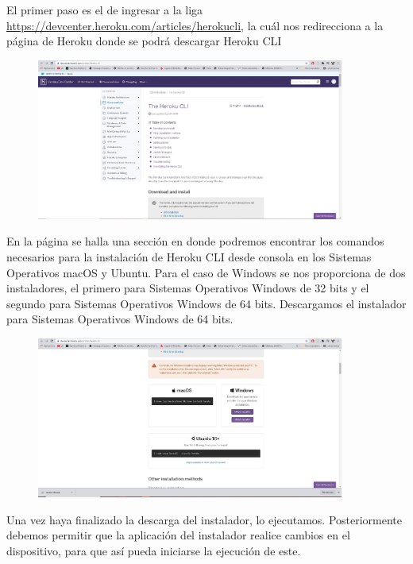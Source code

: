 \documentclass[10pt,a4paper]{article} %
\begin{document}
	\begin{enumerate}
		{\large
			\item El primer paso es el de ingresar a la liga \underline{https://devcenter.heroku.com/articles/herokucli}, la cu{\'a}l nos redirecciona a la p{\'a}gina de Heroku donde se podr{\'a} descargar Heroku CLI
			\begin{figure}[H]
				\includegraphics[width=0.9\textwidth]{1.jpg}
				\centering
				\label{img:paso1}
			\end{figure}
			\item En la p{\'a}gina se halla una secci{\'o}n en donde podremos encontrar los comandos necesarios para la instalaci{\'o}n de Heroku CLI desde consola en los Sistemas Operativos macOS y Ubuntu. Para el caso de Windows se nos proporciona de dos instaladores, el primero para Sistemas Operativos Windows de 32 bits y el segundo para Sistemas Operativos Windows de 64 bits. Descargamos el instalador para Sistemas Operativos Windows de 64 bits.
			\begin{figure}[H]
				\includegraphics[width=0.9\textwidth]{2.jpg}
				\centering
				\label{img:paso2}
			\end{figure}
			
			\pagebreak
			
			\item Una vez haya finalizado la descarga del instalador, lo ejecutamos. Posteriormente debemos permitir que la aplicaci{\'o}n del instalador realice cambios en el dispositivo, para que as{\'i} pueda iniciarse la ejecuci{\'o}n de este. 
			
}
\end{enumerate}
\end{document}
